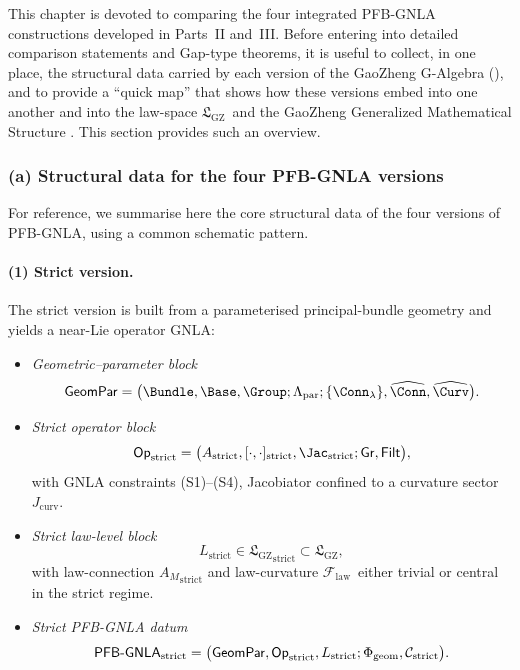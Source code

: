 \documentclass[11pt]{book}
\theoremstyle{plain}
\theoremstyle{definition}
\newcommand{\GZLS}{\ensuremath{\mathfrak{L}_{\mathrm{GZ}}}}       \newcommand{\GZLT}{\ensuremath{M_{!w}}}                           \newcommand{\GZLOC}{\ensuremath{A_M}}                             \newcommand{\GZLCurv}{\ensuremath{\mathcal{F}_{\mathrm{law}}}}
\begin{document}
This chapter is devoted to comparing the four integrated PFB-GNLA
constructions developed in Parts~II and~III. Before entering into
detailed comparison statements and Gap-type theorems, it is useful to
collect, in one place, the structural data carried by each version of
the GaoZheng G-Algebra (\GAlgebra), and to provide a “quick map” that
shows how these versions embed into one another and into the law-space
\GZLS\ and the GaoZheng Generalized Mathematical Structure \GZGMS. This
section provides such an overview.



\subsubsection*{(a) Structural data for the four PFB-GNLA versions}

For reference, we summarise here the core structural data of the four
versions of PFB-GNLA, using a common schematic pattern.

\paragraph{(1) Strict version.}

The strict version is built from a parameterised principal-bundle
geometry and yields a near-Lie operator GNLA:

\begin{itemize}
  \item \emph{Geometric--parameter block}
    \[
      \mathsf{GeomPar}
      =
      \bigl(
        \Bundle,\Base,\Group;
        \Lambda_{\mathrm{par}};
        \{\Conn_\lambda\},
        \widehat{\Conn},\widehat{\Curv}
      \bigr).
    \]
  \item \emph{Strict operator block}
    \[
      \mathsf{Op}_{\mathrm{strict}}
      =
      \bigl(
        A_{\mathrm{strict}},
        [\cdot,\cdot]_{\mathrm{strict}},
        \Jac_{\mathrm{strict}};
        \mathsf{Gr},\mathsf{Filt}
      \bigr),
    \]
    with GNLA constraints (S1)--(S4), Jacobiator confined to a
    curvature sector $J_{\mathrm{curv}}$.
  \item \emph{Strict law-level block}
    \[
      L_{\mathrm{strict}}
      \in
      {\GZLS}_{\mathrm{strict}}
      \subset\GZLS,
    \]
    with law-connection ${\GZLOC}_{\mathrm{strict}}$ and law-curvature
    \GZLCurv\ either trivial or central in the strict regime.
  \item \emph{Strict PFB-GNLA datum}
    \[
      \mathsf{PFB\text- GNLA}_{\mathrm{strict}}
      =
      \bigl(
        \mathsf{GeomPar},
        \mathsf{Op}_{\mathrm{strict}},
        L_{\mathrm{strict}};
        \Phi_{\mathrm{geom}},
        \mathcal{C}_{\mathrm{strict}}
      \bigr).
    \]
\end{itemize}
\end{document}

